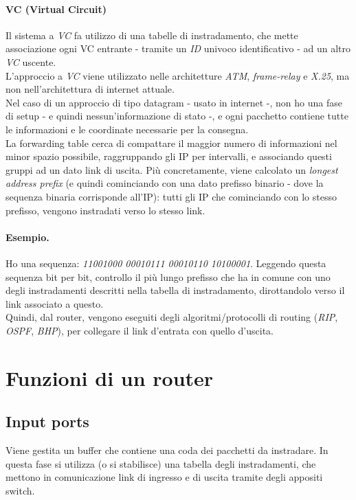\paragraph{VC (Virtual Circuit)}
Il sistema a \textit{VC} fa utilizzo di una tabelle di instradamento, che mette associazione ogni VC entrante - tramite un \textit{ID} univoco identificativo - ad un altro \textit{VC} uscente. \\
L'approccio a \textit{VC} viene utilizzato nelle architetture \textit{ATM}, \textit{frame-relay} e \textit{X.25}, ma non nell'architettura di internet attuale. \hfill \\

Nel caso di un approccio di tipo datagram - usato in internet -, non ho una fase di setup - e quindi nessun'informazione di stato -, e ogni pacchetto contiene tutte le informazioni  e le coordinate necessarie per la consegna. \\
La forwarding table cerca di compattare il maggior numero di informazioni nel minor spazio possibile, raggruppando gli IP per intervalli, e associando questi gruppi ad un dato link di uscita. Più concretamente, viene calcolato un \textit{longest address prefix} (e quindi cominciando con una dato prefisso binario - dove la sequenza binaria corrisponde all'IP): tutti gli IP che cominciando con lo stesso prefisso, vengono instradati verso lo stesso link.

\paragraph{Esempio.}
Ho una sequenza: \textit{11001000 00010111 00010110 10100001}. Leggendo questa sequenza bit per bit, controllo il più lungo prefisso che ha in comune con uno degli instradamenti descritti nella tabella di instradamento, dirottandolo verso il link associato a questo. \hfill \\

Quindi, dal router, vengono eseguiti degli algoritmi/protocolli di routing (\textit{RIP}, \textit{OSPF}, \textit{BHP}), per collegare il link d'entrata con quello d'uscita.

\section{Funzioni di un router}
\subsection{Input ports}
Viene gestita un buffer che contiene una coda dei pacchetti da instradare. In questa fase si utilizza (o si stabilisce) una tabella degli instradamenti, che mettono in comunicazione link di ingresso e di uscita tramite degli appositi switch.
